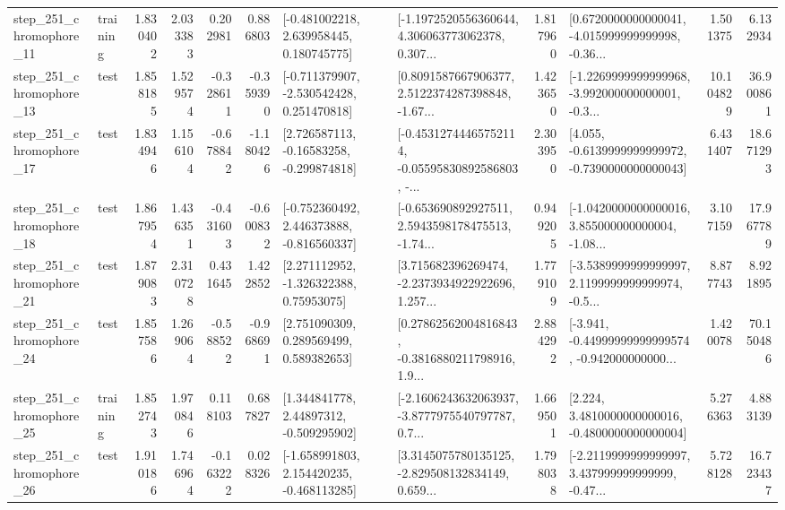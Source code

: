\begin{tabular}{llrrrrllrlrr}
  step\_251\_chromophore\_11 &  training &      1.830402 &    2.033383 &      0.202981 &  0.886803 &    [-0.481002218, 2.639958445, 0.180745775] &  [-1.1972520556360644, 4.306063773062378, 0.307... &       1.817960 &  [0.6720000000000041, -4.015999999999998, -0.36... &            1.501375 &          6.132934 \\
  step\_251\_chromophore\_13 &      test &      1.858185 &    1.529574 &     -0.328611 & -0.359390 &   [-0.711379907, -2.530542428, 0.251470818] &  [0.8091587667906377, 2.5122374287398848, -1.67... &       1.423650 &  [-1.2269999999999968, -3.992000000000001, -0.3... &           10.104829 &         36.900861 \\
  step\_251\_chromophore\_17 &      test &      1.834946 &    1.156104 &     -0.678842 & -1.180426 &    [2.726587113, -0.16583258, -0.299874818] &  [-0.45312744465752114, -0.05595830892586803, -... &       2.303950 &  [4.055, -0.6139999999999972, -0.7390000000000043] &            6.431407 &         18.671293 \\
  step\_251\_chromophore\_18 &      test &      1.867954 &    1.436351 &     -0.431603 & -0.600832 &   [-0.752360492, 2.446373888, -0.816560337] &  [-0.653690892927511, 2.5943598178475513, -1.74... &       0.949205 &  [-1.0420000000000016, 3.855000000000004, -1.08... &            3.107159 &         17.967789 \\
  step\_251\_chromophore\_21 &      test &      1.879083 &    2.310728 &      0.431645 &  1.422852 &     [2.271112952, -1.326322388, 0.75953075] &  [3.715682396269474, -2.2373934922922696, 1.257... &       1.779109 &  [-3.5389999999999997, 2.1199999999999974, -0.5... &            8.877743 &          8.921895 \\
  step\_251\_chromophore\_24 &      test &      1.857586 &    1.269064 &     -0.588522 & -0.968691 &     [2.751090309, 0.289569499, 0.589382653] &  [0.27862562004816843, -0.3816880211798916, 1.9... &       2.884292 &  [-3.941, -0.44999999999999574, -0.942000000000... &            1.420078 &         70.150486 \\
  step\_251\_chromophore\_25 &  training &      1.852743 &    1.970846 &      0.118103 &  0.687827 &     [1.344841778, 2.44897312, -0.509295902] &  [-2.1606243632063937, -3.8777975540797787, 0.7... &       1.669501 &   [2.224, 3.4810000000000016, -0.4800000000000004] &            5.276363 &          4.883139 \\
  step\_251\_chromophore\_26 &      test &      1.910186 &    1.746964 &     -0.163222 &  0.028326 &   [-1.658991803, 2.154420235, -0.468113285] &  [3.3145075780135125, -2.829508132834149, 0.659... &       1.798038 &  [-2.2119999999999997, 3.437999999999999, -0.47... &            5.728128 &         16.723437 \\

\end{tabular}
